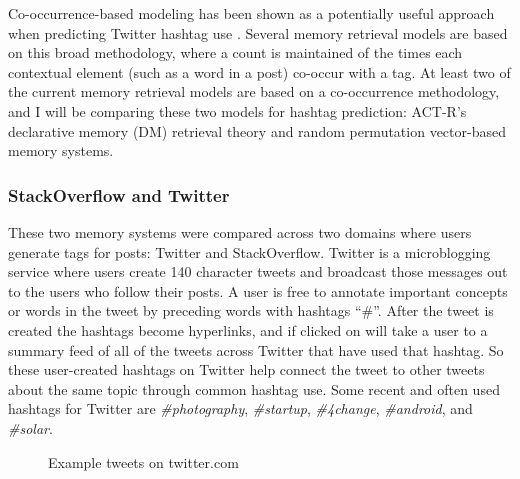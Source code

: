 \documentclass[man,floatsintext,donotrepeattitle]{apa6}
\begin{document}
Co-occurrence-based modeling has been shown as a potentially useful approach when predicting Twitter hashtag use \parencite{Efron2010}.
Several memory retrieval models are based on this broad methodology, where a count is maintained of the times each contextual element (such as a word in a post) co-occur with a tag.
At least two of the current memory retrieval models are based on a co-occurrence methodology, and I will be comparing these two models for hashtag prediction:
ACT-R's declarative memory (DM) retrieval theory and random permutation vector-based memory systems.

\subsubsection{StackOverflow and Twitter}

These two memory systems were compared across two domains where users generate tags for posts: Twitter and StackOverflow.
Twitter is a microblogging service where users create 140 character tweets and broadcast those messages out to the users who follow their posts.
A user is free to annotate important concepts or words in the tweet by preceding words with hashtags ``\#''.
After the tweet is created the hashtags become hyperlinks, and if clicked on will take a user to a summary feed of all of the tweets across Twitter that have used that hashtag.
So these user-created hashtags on Twitter help connect the tweet to other tweets about the same topic through common hashtag use.
Some recent and often used hashtags for Twitter are \emph{\#photography}, \emph{\#startup}, \emph{\#4change}, \emph{\#android}, and \emph{\#solar}.

\begin{figure}[!htbp]
  {%
    \setlength{\fboxsep}{0pt}%
    \setlength{\fboxrule}{1pt}%
    \hfill
    \hfill
    \hfill
    \vfill
    \hfill
    \hfill
    \hfill
    \caption{Example tweets on twitter.com}
    \label{figTweetExample}
  }%
\end{figure}
\end{document}
